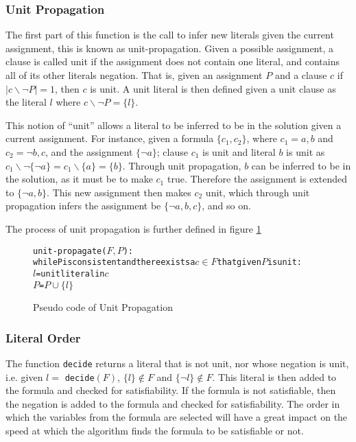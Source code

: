 \subsubsection{Unit Propagation}
The first part of this function is the call to infer new literals given the current assignment, this is known as unit-propagation.
Given a possible assignment, a clause is called unit if the assignment does not contain one literal, and contains all of its other literals negation.
That is, given an assignment $P$ and a clause $c$ if $|c \backslash \neg P| = 1$, then $c$ is unit.
A unit literal is then defined given a unit clause as the literal $l$ where $ c \backslash \neg P = \{l\}$.

This notion of ``unit'' allows a literal to be inferred to be in the solution given a current assignment.
For instance, given a formula $\{c_1,c_2\}$, where $c_1 = {a,b}$ and $c_2 = {\neg b, c}$, and the assignment $\{\neg a\}$;
clause $c_1$ is unit and literal $b$ is unit as $c_1 \backslash \neg \{\neg a\} = c_1 \backslash\{ a\} = \{b\}$.
Through unit propagation, $b$ can be inferred to be in the solution, as it must be to make $c_1$ true.
Therefore the assignment is extended to $\{\neg a, b\}$.
This new assignment then makes $c_2$ unit, which through unit propagation infers the assignment be $\{\neg a, b, c\}$, and so on.

The process of unit propagation is further defined in figure \ref{impl.propagation}
\begin{figure}[htp]
\begin{center}
\begin{alltt}
unit-propagate(\(F, P\)):
    while P is consistent and there exists a \(c \in F\) that given \(P\) is unit:
        \(l\) = unit literal in \(c\)
        \(P\) = \(P \cup \{l\}\)
\end{alltt}
  \caption{Pseudo code of Unit Propagation}
  \label{impl.propagation}
\end{center}
\end{figure}

\subsubsection{Literal Order}
The function \verb+decide+ returns a literal that is not unit, nor whose negation is unit, i.e. given $l =$ \verb+decide+$(F)$, $\{l\} \not \in F$ and $\{\neg l\} \not \in F$.
This literal is then added to the formula and checked for satisfiability.
If the formula is not satisfiable, then the negation is added to the formula and checked for satisfiability.  
The order in which the variables from the formula are selected will have a great impact on the speed at which the algorithm finds the formula to be satisfiable or not.


